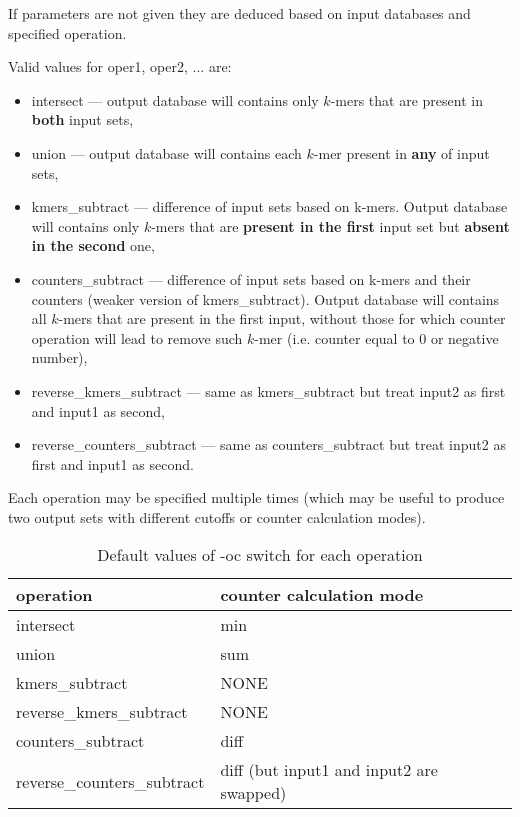 If parameters are not given they are deduced based on input databases and specified operation.


Valid values for \textsf{oper1, oper2, ...} are:
\begin{itemize}
	\item \textsf{intersect} --- output database will contains only $k$-mers that are present in \textbf{both} input sets,
	\item \textsf{union} --- output database will contains each $k$-mer present in \textbf{any} of input sets,
	\item \textsf{kmers\_subtract} --- difference of input sets based on k-mers. Output database will contains only $k$-mers that are \textbf{present in the first} input set but \textbf{absent in the second} one,
	\item \textsf{counters\_subtract} --- difference of input sets based on k-mers and their counters (weaker version of kmers\_subtract). Output database will contains all $k$-mers that are present in the first input, without those for which counter operation will lead to remove such $k$-mer (i.e. counter equal to 0 or negative number),
	\item \textsf{reverse\_kmers\_subtract} --- same as kmers\_subtract but treat input2 as first and input1 as second,
	\item \textsf{reverse\_counters\_subtract} --- same as counters\_subtract but treat input2 as first and input1 as second.	
\end{itemize}
Each operation may be specified multiple times (which may be useful to produce two output sets with different cutoffs or counter calculation modes).



\begin{table}[H]
\centering
\begin{tabular}{|l|l|}
\hline
\textbf{operation} & \textbf{counter calculation mode} \\
\hline
\textsf{intersect} & \textsf{min} \\
\hline
\textsf{union} & \textsf{sum} \\
\hline
\textsf{kmers\_subtract} & NONE \\
\hline
\textsf{reverse\_kmers\_subtract} & NONE \\
\hline
\textsf{counters\_subtract} & \textsf{diff} \\
\hline
\textsf{reverse\_counters\_subtract} & \textsf{diff} (but input1 and input2 are swapped) \\
\hline
\end{tabular}
\caption{Default values of -oc switch for each operation}
\label{table:defaults_counter_mode}
\end{table}

